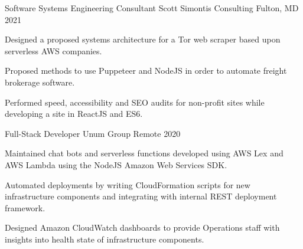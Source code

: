 

\begin{cventries}

  \cventry
    {Software Systems Engineering Consultant} %
    {Scott Simontis Consulting} %
    {Fulton, MD} %
    {2021} %
    {
      \begin{cvitems}
        \item {Designed a proposed systems architecture for a Tor web scraper based upon serverless AWS companies.}
        \item {Proposed methods to use Puppeteer and NodeJS in order to automate freight brokerage software.}
        \item {Performed speed, accessibility and SEO audits for non-profit sites while developing a site in ReactJS and ES6.}
      \end{cvitems}
    }

  \cventry
    {Full-Stack Developer} %
    {Unum Group} %
    {Remote} %
    {2020} %
    {
      \begin{cvitems}
        \item {Maintained chat bots and serverless functions developed using AWS Lex and AWS Lambda using the NodeJS Amazon Web Services SDK.}
        \item {Automated deployments by writing CloudFormation scripts for new infrastructure components and integrating with internal REST deployment framework.}
        \item {Designed Amazon CloudWatch dashboards to provide Operations staff with insights into health state of infrastructure components.}
      \end{cvitems}
    }


\end{cventries}
